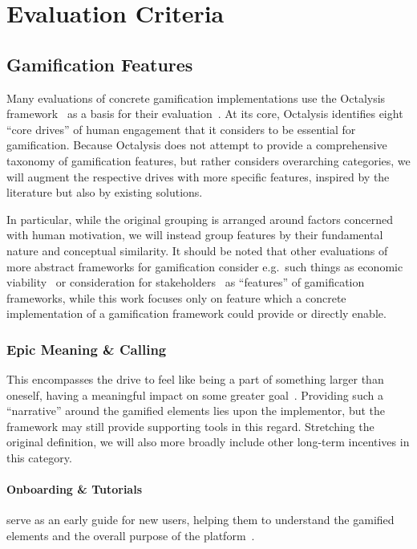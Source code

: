 \documentclass[runningheads]{llncs}
\begin{document}
\section{Evaluation Criteria}

\subsection{Gamification Features}

Many evaluations of concrete gamification implementations use the Octalysis framework~\cite{Chou15} as a basis for their evaluation~\cite{SANCN24, EDPKM15, ChrWa21, MohaB23}. At its core, Octalysis identifies eight \enquote{core drives} of human engagement that it considers to be essential for gamification. Because Octalysis does not attempt to provide a comprehensive taxonomy of gamification features, but rather considers overarching categories, we will augment the respective drives with more specific features, inspired by the literature but also by existing solutions.

In particular, while the original grouping is arranged around factors concerned with human motivation, we will instead group features by their fundamental nature and conceptual similarity. It should be noted that other evaluations of more abstract frameworks for gamification consider e.g.~such things as economic viability~\cite{GearB13} or consideration for stakeholders~\cite{HeAWS15} as \enquote{features} of gamification frameworks, while this work focuses only on feature which a concrete implementation of a gamification framework could provide or directly enable.

\subsubsection{Epic Meaning \& Calling\label{sec:epic-meaning-calling}} This encompasses the drive to feel like being a part of something larger than oneself, having a meaningful impact on some greater goal~\cite{Chou15}. Providing such a \enquote{narrative} around the gamified elements lies upon the implementor, but the framework may still provide supporting tools in this regard. Stretching the original definition, we will also more broadly include other long-term incentives in this category.

\paragraph{Onboarding \& Tutorials} serve as an early guide for new users, helping them to understand the gamified elements and the overall purpose of the platform~\cite{Herz14, ZichC11}.
\end{document}
